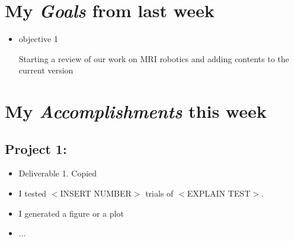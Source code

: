 \newcommand{\handoutName}{Weekly report}
\newcommand{\handoutdate}{\today}
\newcommand{\duedate}{}

\section{My \emph{Goals} from last week}
\begin{itemize}
\item objective 1

Starting a review of our work on MRI robotics and adding contents to the current version

\end{itemize}

\section{My \emph{Accomplishments} this week}

\subsection{Project 1: \emph{}}

\begin{itemize}
\item Deliverable 1. Copied  

\item I tested $<$INSERT NUMBER$>$ trials of $<$EXPLAIN TEST$>$.
\item I generated a figure or a plot
\item $\ldots$
\end{itemize}


